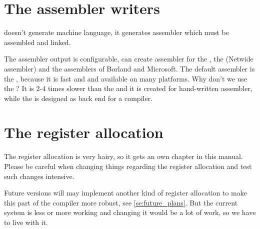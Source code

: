 \label{ch:code_generation}

\chapter{The assembler writers}
\label{ch:assembler_writers}

\fpc doesn't generate machine language, it generates
assembler which must be assembled and linked.

The assembler output is configurable, \fpc can create
assembler for the , the  (Netwide assembler) and
the assemblers of Borland and Microsoft. The default assembler
is the , because it is fast and and available on
many platforms. Why don't we use the ? It is 2-4 times
slower than the  and it is created for
hand-written assembler, while the  is designed
as back end for a compiler.


\chapter{The register allocation}

The register allocation is very hairy, so it gets
an own chapter in this manual. Please be careful when changing things
regarding the register allocation and test such changes intensive.

Future versions will may implement another kind of register allocation
to make this part of the compiler more robust, see
\ref{se:future_plans}. But the current
system is less or more working and changing it would be a lot of
work, so we have to live with it.

